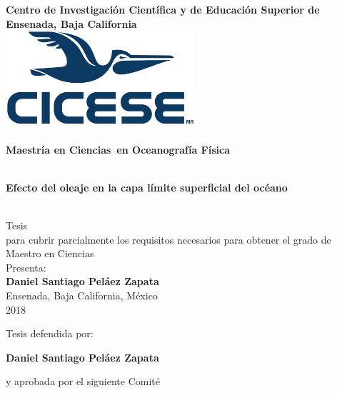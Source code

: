 \documentclass[11pt]{report}
\def\thesisyear{2018}
\def\thesisauthor{Daniel Santiago Peláez Zapata}
\def\thesistitle{Efecto del oleaje en la capa límite superficial del océano}
\def\thesissubject{Oceanografía Física}
\def\thesiskindtitle{Maestro en Ciencias}
\def\thesiskindformal{Maestría en Ciencias}
\def\thesiscity{Ensenada}
\def\thesisstate{Baja California}
\def\thesiscountry{México}
\def\thesisuniversity{Centro de Investigación Científica y de Educación
                      Superior de Ensenada, Baja California}
\begin{document}
\begin{titlepage}

  \newpage
  \thispagestyle{empty}
  \begin{center}
    \huge{\textbf{\thesisuniversity}} \\
    \vspace{1.9cm} 
    \includegraphics[width=7cm]{frontmatter/logo_cicese.pdf} \\
    \vspace{0.9cm}
    \vrule width 15.5cm height .5pt \\
    \huge{\textbf{\thesiskindformal~en \thesissubject}} \\
    \vrule width 15.5cm height .1pt \\
    \vspace{0.9cm}
    \parbox{10cm}{
      \centering
      \LARGE{\textbf{\thesistitle}}
    } \\
    \vspace{1.9cm}
    \normalsize{
      Tesis \\
      para cubrir parcialmente los requisitos necesarios para obtener el grado de \\ 
      \thesiskindtitle
    }
    \\
    \vspace{0.9cm}
    \large{Presenta:} \\
    \vspace{0.7cm}
    \textbf{\Large{\thesisauthor}} \\
    \vfill
    \large{
      \thesiscity, \thesisstate, \thesiscountry \\
      \thesisyear
    }
    \newpage
  \end{center}

  \newpage
  \thispagestyle{empty}
  \begin{center}
    Tesis defendida por:

    \Large{\bfseries{\thesisauthor}}
    \vspace{0.5cm}

    \normalsize{y aprobada por el siguiente Comité}
    \vspace{1.5cm}


\end{center}
\end{titlepage}
\end{document}
